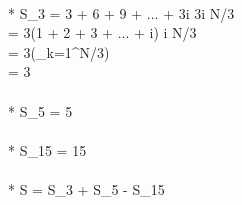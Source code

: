 
\\* S_{3} = 3 + 6 + 9 + ... + 3i \hspace{10ex} 3i \leq N/3 \\[1ex]
\phantom{x} \hspace{1ex} = 3(1 + 2 + 3 + ... + i) \hspace{9ex} i \leq N/3 \\[1ex]
\phantom{x} \hspace{1ex} = 3(\sum_{k=1}^{N/3}) \\[1ex]
\phantom{x} \hspace{1ex} = 3 \\[3ex]

\\* S_{5} = 5 \\[3ex]

\\* S_{15} = 15 \\[3ex]

\\* S = S_{3} + S_{5} - S_{15}